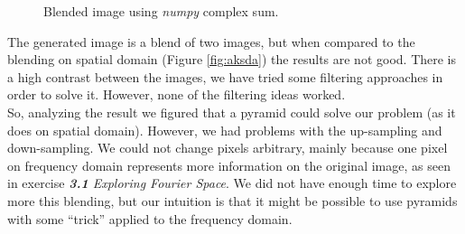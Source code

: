 \documentclass[12pt,a4paper]{article}
\begin{document}
\begin{figure}[!h]
	\centering
	{%
		\setlength{\fboxsep}{1pt}%
		\setlength{\fboxrule}{1pt}%
	}%
	\caption{Blended image using \emph{numpy} complex sum.}
	\label{fig:fourier2}
\end{figure}

The generated image is a blend of two images, but when compared to the blending on spatial domain (Figure \ref{fig:aksda}) the results are not good. There is a high contrast between the images, we have tried some filtering approaches in order to solve it. However, none of the filtering ideas worked. \\

So, analyzing the result we figured that a pyramid could solve our problem (as it does on spatial domain). However, we had problems with the up-sampling and down-sampling. We could not change pixels arbitrary, mainly because one pixel on frequency domain represents more information on the original image, as seen in exercise \emph{\textbf{3.1} Exploring Fourier Space}. We did not have enough time to explore more this blending, but our intuition is that it might be possible to use pyramids with some ``trick'' applied to the frequency domain. 
\end{document}
